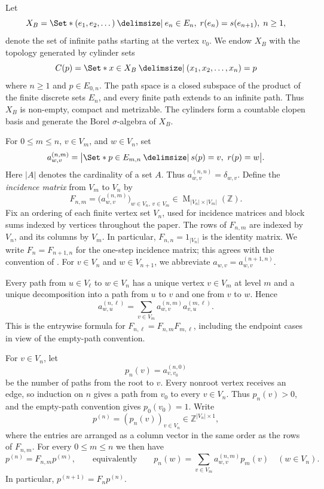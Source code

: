\documentclass[11pt]{amsart}
\newcommand{\setZ}{\mathbb Z}
\providecommand\given{}
\newcommand\SetSymbol[1][]{%
  \nonscript\:#1\vert\allowbreak\nonscript\:\mathopen{}%
}
\renewcommand\given{\SetSymbol[\delimsize]}#1%
\DeclareMathOperator{\Mat}{M}
\theoremstyle{definition}
\theoremstyle{remark}
\begin{document}
Let
\[
X_B = \Set*{(e_1, e_2, \dots) \given
e_n \in E_n, \; r(e_n) = s(e_{n+1}), \; n \geq 1},
\]
denote the set of infinite paths starting at the vertex \(v_{0}\).
We endow \(X_B\) with the topology generated by cylinder sets
\[
C(p) = \Set*{x \in X_B \given (x_1, x_2, \dots, x_n) = p}
\]
where $n \geq 1$ and $p\in E_{0,n}$.
The path space is a closed subspace of the product of the finite
discrete sets $E_n$, and every finite path extends to an infinite path.
Thus $X_B$ is non-empty, compact and metrizable.
The cylinders form
a countable clopen basis and generate the Borel $\sigma$-algebra
of $X_B$.

For $0\leq m\leq n$, $v\in V_m$, and $w\in V_n$, set
\[
 a_{w,v}^{(n,m)}
 =\bigl|\Set*{ p\in E_{m,n}  \given s(p)=v,\ r(p)=w }\bigr|.
\]
Here $|A|$ denotes the cardinality of a set $A$.
Thus $a_{w,v}^{(n,n)}=\delta_{w,v}$.
Define the \emph{incidence matrix} from \(V_{m}\) to $V_{n}$ by
\[
 F_{n,m}
 =\bigl(a_{w,v}^{(n,m)}\bigr)_{w\in V_n,\,v\in V_m}
 \in \Mat_{|V_n|\times |V_m|}(\setZ).
\]
Fix an ordering of each finite vertex set $V_n$, used for incidence
matrices and block sums indexed by vertices throughout the paper.  The rows of $F_{n,m}$ are indexed by $V_n$, and its columns by
$V_m$.
In particular, $F_{n,n} = 1_{|V_n|}$ is the identity matrix.
We write $F_n=F_{n+1,n}$ for the one-step incidence matrix; this agrees with
the convention of \cite[Section~2.2]{BezuglyiKarpel2016}.
For $v\in V_n$ and $w\in V_{n+1}$, we abbreviate $a_{w,v}=a_{w,v}^{(n+1,n)}$.

Every path from $u\in V_\ell$ to $w\in V_n$ has a unique vertex
$v\in V_m$ at level $m$ and a unique decomposition into a path from $u$
to $v$ and one from $v$ to $w$.  Hence
\[
 a_{w,u}^{(n,\ell)}
 =\sum_{v\in V_m}a_{w,v}^{(n,m)}a_{v,u}^{(m,\ell)}.
\]
This is the entrywise formula for
$F_{n,\ell}=F_{n,m}F_{m,\ell}$, including the endpoint cases in view of
the empty-path convention.

For $v\in V_n$, let
\[
 p_n(v)=a_{v,v_0}^{(n,0)}
\]
be the number of paths from the root to $v$.
Every nonroot vertex receives an edge, so induction on $n$ gives a
path from $v_0$ to every $v\in V_n$.  Thus $p_n(v)>0$, and the
empty-path convention gives $p_0(v_0)=1$.  Write
\[
 p^{(n)}=(p_n(v))_{v\in V_n}\in\setZ^{|V_n|\times1},
\]
where the entries are arranged as a column vector in the same order as the
rows of $F_{n,m}$.
For every $0\leq m\leq n$ we then have
\begin{equation}\label{eq:path-count}
 p^{(n)}=F_{n,m}p^{(m)},
 \qquad\text{equivalently}\qquad
 p_n(w)=\sum_{v\in V_m}a_{w,v}^{(n,m)}p_m(v)
 \quad(w\in V_n).
\end{equation}
In particular, $p^{(n+1)}=F_np^{(n)}$.
\end{document}
